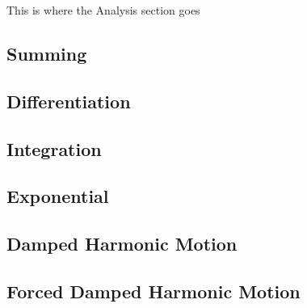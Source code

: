 This is where the Analysis section goes


\subsection{Summing}

\subsection{Differentiation}

\subsection{Integration}

\subsection{Exponential}

\subsection{Damped Harmonic Motion}

\subsection{Forced Damped Harmonic Motion}